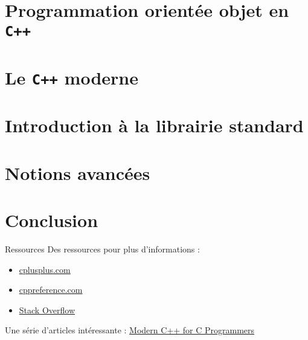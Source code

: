 \documentclass{beamer}
\begin{document}
\section{Programmation orientée objet en \texttt{C++}}
\label{sec:poo}



\section{Le \texttt{C++} moderne}
\label{sec:cpp-moderne}



\section{Introduction à la librairie standard}
\label{sec:cpp-std}



\section{Notions avancées}
\label{sec:cpp-avance}



\section*{Conclusion}
\label{sec:conclusion}
\begin{frame}{Ressources}
  Des ressources pour plus d'informations :
  \begin{itemize}
  \item \href{http://www.cplusplus.com/}{cplusplus.com}
  \item \href{https://en.cppreference.com/w/}{cppreference.com}
  \item \href{https://stackoverflow.com/}{Stack Overflow}
  \end{itemize}

  Une série d'articles intéressante : \href{https://ds9a.nl/articles/posts/cpp-intro/}{Modern C++ for C Programmers}
\end{frame}
\end{document}
